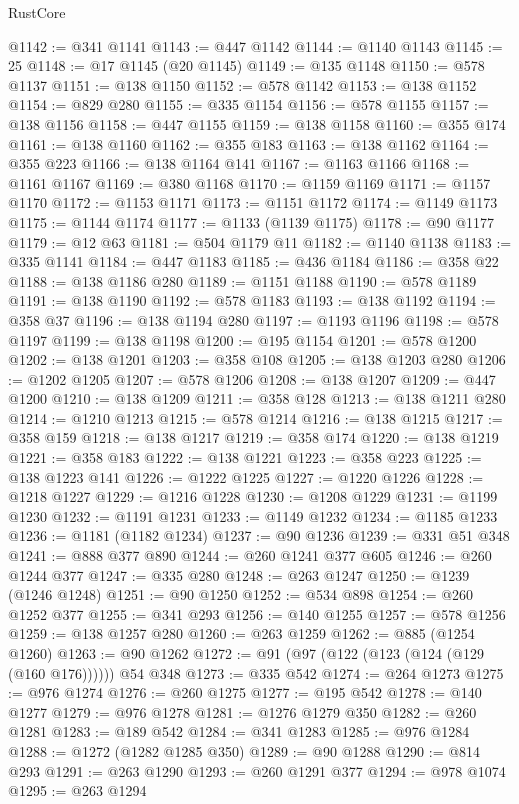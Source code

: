 \begin{lexlean}{RustCore}
\begin{coremodule}
@1142 := @341 @1141
@1143 := @447 @1142
@1144 := @1140 @1143
@1145 := 25
@1148 := @17 @1145 (@20 @1145)
@1149 := @135 @1148
@1150 := @578 @1137
@1151 := @138 @1150
@1152 := @578 @1142
@1153 := @138 @1152
@1154 := @829 @280
@1155 := @335 @1154
@1156 := @578 @1155
@1157 := @138 @1156
@1158 := @447 @1155
@1159 := @138 @1158
@1160 := @355 @174
@1161 := @138 @1160
@1162 := @355 @183
@1163 := @138 @1162
@1164 := @355 @223
@1166 := @138 @1164 @141
@1167 := @1163 @1166
@1168 := @1161 @1167
@1169 := @380 @1168
@1170 := @1159 @1169
@1171 := @1157 @1170
@1172 := @1153 @1171
@1173 := @1151 @1172
@1174 := @1149 @1173
@1175 := @1144 @1174
@1177 := @1133 (@1139 @1175)
@1178 := @90 @1177
@1179 := @12 @63
@1181 := @504 @1179 @11
@1182 := @1140 @1138
@1183 := @335 @1141
@1184 := @447 @1183
@1185 := @436 @1184
@1186 := @358 @22
@1188 := @138 @1186 @280
@1189 := @1151 @1188
@1190 := @578 @1189
@1191 := @138 @1190
@1192 := @578 @1183
@1193 := @138 @1192
@1194 := @358 @37
@1196 := @138 @1194 @280
@1197 := @1193 @1196
@1198 := @578 @1197
@1199 := @138 @1198
@1200 := @195 @1154
@1201 := @578 @1200
@1202 := @138 @1201
@1203 := @358 @108
@1205 := @138 @1203 @280
@1206 := @1202 @1205
@1207 := @578 @1206
@1208 := @138 @1207
@1209 := @447 @1200
@1210 := @138 @1209
@1211 := @358 @128
@1213 := @138 @1211 @280
@1214 := @1210 @1213
@1215 := @578 @1214
@1216 := @138 @1215
@1217 := @358 @159
@1218 := @138 @1217
@1219 := @358 @174
@1220 := @138 @1219
@1221 := @358 @183
@1222 := @138 @1221
@1223 := @358 @223
@1225 := @138 @1223 @141
@1226 := @1222 @1225
@1227 := @1220 @1226
@1228 := @1218 @1227
@1229 := @1216 @1228
@1230 := @1208 @1229
@1231 := @1199 @1230
@1232 := @1191 @1231
@1233 := @1149 @1232
@1234 := @1185 @1233
@1236 := @1181 (@1182 @1234)
@1237 := @90 @1236
@1239 := @331 @51 @348
@1241 := @888 @377 @890
@1244 := @260 @1241 @377 @605
@1246 := @260 @1244 @377
@1247 := @335 @280
@1248 := @263 @1247
@1250 := @1239 (@1246 @1248)
@1251 := @90 @1250
@1252 := @534 @898
@1254 := @260 @1252 @377
@1255 := @341 @293
@1256 := @140 @1255
@1257 := @578 @1256
@1259 := @138 @1257 @280
@1260 := @263 @1259
@1262 := @885 (@1254 @1260)
@1263 := @90 @1262
@1272 := @91 (@97 (@122 (@123 (@124 (@129 (@160 @176)))))) @54 @348
@1273 := @335 @542
@1274 := @264 @1273
@1275 := @976 @1274
@1276 := @260 @1275
@1277 := @195 @542
@1278 := @140 @1277
@1279 := @976 @1278
@1281 := @1276 @1279 @350
@1282 := @260 @1281
@1283 := @189 @542
@1284 := @341 @1283
@1285 := @976 @1284
@1288 := @1272 (@1282 @1285 @350)
@1289 := @90 @1288
@1290 := @814 @293
@1291 := @263 @1290
@1293 := @260 @1291 @377
@1294 := @978 @1074
@1295 := @263 @1294

\end{coremodule}
\end{lexlean}
